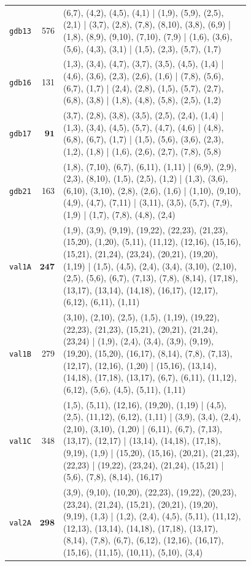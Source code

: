 \begin{landscape}
\begin{longtable}{lr>{\tiny\raggedright\arraybackslash}p{0.78\linewidth}}
\texttt{gdb13} & 576 & (6,7), (4,2), (4,5), (4,1) | (1,9), (5,9), (2,5), (2,1) | (3,7), (2,8), (7,8), (8,10), (3,8), (6,9) | (1,8), (8,9), (9,10), (7,10), (7,9) | (1,6), (3,6), (5,6), (4,3), (3,1) | (1,5), (2,3), (5,7), (1,7) \\[2pt]
\texttt{gdb16} & 131 & (1,3), (3,4), (4,7), (3,7), (3,5), (4,5), (1,4) | (4,6), (3,6), (2,3), (2,6), (1,6) | (7,8), (5,6), (6,7), (1,7) | (2,4), (2,8), (1,5), (5,7), (2,7), (6,8), (3,8) | (1,8), (4,8), (5,8), (2,5), (1,2) \\[2pt]
\texttt{gdb17} & $\mathbf{91}$ & (3,7), (2,8), (3,8), (3,5), (2,5), (2,4), (1,4) | (1,3), (3,4), (4,5), (5,7), (4,7), (4,6) | (4,8), (6,8), (6,7), (1,7) | (1,5), (5,6), (3,6), (2,3), (1,2), (1,8) | (1,6), (2,6), (2,7), (7,8), (5,8) \\[2pt]
\texttt{gdb21} & 163 & (1,8), (7,10), (6,7), (6,11), (1,11) | (6,9), (2,9), (2,3), (8,10), (1,5), (2,5), (1,2) | (1,3), (3,6), (6,10), (3,10), (2,8), (2,6), (1,6) | (1,10), (9,10), (4,9), (4,7), (7,11) | (3,11), (3,5), (5,7), (7,9), (1,9) | (1,7), (7,8), (4,8), (2,4) \\[2pt]
\texttt{val1A} & $\mathbf{247}$ & (1,9), (3,9), (9,19), (19,22), (22,23), (21,23), (15,20), (1,20), (5,11), (11,12), (12,16), (15,16), (15,21), (21,24), (23,24), (20,21), (19,20), (1,19) | (1,5), (4,5), (2,4), (3,4), (3,10), (2,10), (2,5), (5,6), (6,7), (7,13), (7,8), (8,14), (17,18), (13,17), (13,14), (14,18), (16,17), (12,17), (6,12), (6,11), (1,11) \\[2pt]
\texttt{val1B} & 279 & (3,10), (2,10), (2,5), (1,5), (1,19), (19,22), (22,23), (21,23), (15,21), (20,21), (21,24), (23,24) | (1,9), (2,4), (3,4), (3,9), (9,19), (19,20), (15,20), (16,17), (8,14), (7,8), (7,13), (12,17), (12,16), (1,20) | (15,16), (13,14), (14,18), (17,18), (13,17), (6,7), (6,11), (11,12), (6,12), (5,6), (4,5), (5,11), (1,11) \\[2pt]
\texttt{val1C} & 348 & (1,5), (5,11), (12,16), (19,20), (1,19) | (4,5), (2,5), (11,12), (6,12), (1,11) | (3,9), (3,4), (2,4), (2,10), (3,10), (1,20) | (6,11), (6,7), (7,13), (13,17), (12,17) | (13,14), (14,18), (17,18), (9,19), (1,9) | (15,20), (15,16), (20,21), (21,23), (22,23) | (19,22), (23,24), (21,24), (15,21) | (5,6), (7,8), (8,14), (16,17) \\[2pt]
\texttt{val2A} & $\mathbf{298}$ & (3,9), (9,10), (10,20), (22,23), (19,22), (20,23), (23,24), (21,24), (15,21), (20,21), (19,20), (9,19), (1,3) | (1,2), (2,4), (4,5), (5,11), (11,12), (12,13), (13,14), (14,18), (17,18), (13,17), (8,14), (7,8), (6,7), (6,12), (12,16), (16,17), (15,16), (11,15), (10,11), (5,10), (3,4) \\[2pt]

\end{longtable}
\end{landscape}
